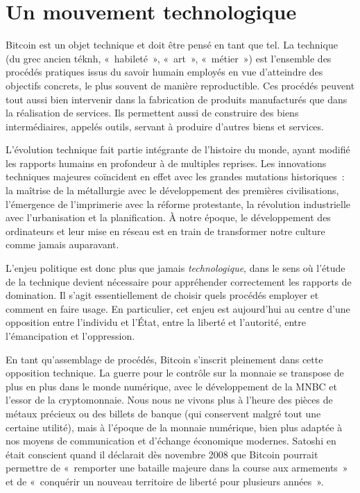 
\chapter{Un mouvement technologique}
\label{ch:cypherpunks}

Bitcoin est un objet technique et doit être pensé en tant que tel. La technique (du grec ancien \foreignlanguage{greek}{téknh}, «~habileté~», «~art~», «~métier~») est l'ensemble des procédés pratiques issus du savoir humain employés en vue d'atteindre des objectifs concrets, le plus souvent de manière reproductible. Ces procédés peuvent tout aussi bien intervenir dans la fabrication de produits manufacturés que dans la réalisation de services. Ils permettent aussi de construire des biens intermédiaires, appelés outils, servant à produire d'autres biens et services.

L'évolution technique fait partie intégrante de l'histoire du monde, ayant modifié les rapports humains en profondeur à de multiples reprises. Les innovations techniques majeures coïncident en effet avec les grandes mutations historiques~: la maîtrise de la métallurgie avec le développement des premières civilisations, l'émergence de l'imprimerie avec la réforme protestante, la révolution industrielle avec l'urbanisation et la planification. À notre époque, le développement des ordinateurs et leur mise en réseau est en train de transformer notre culture comme jamais auparavant.

L'enjeu politique est donc plus que jamais \emph{technologique}, dans le sens où l'étude de la technique devient nécessaire pour appréhender correctement les rapports de domination. Il s'agit essentiellement de choisir quels procédés employer et comment en faire usage.  En particulier, cet enjeu est aujourd'hui au centre d'une opposition entre l'individu et l'État, entre la liberté et l'autorité, entre l'émancipation et l'oppression.

En tant qu'assemblage de procédés, Bitcoin s'inscrit pleinement dans cette opposition technique. La guerre pour le contrôle sur la monnaie se transpose de plus en plus dans le monde numérique, avec le développement de la MNBC et l'essor de la cryptomonnaie. Nous nous ne vivons plus à l'heure des pièces de métaux précieux ou des billets de banque (qui conservent malgré tout une certaine utilité), mais à l'époque de la monnaie numérique, bien plus adaptée à nos moyens de communication et d'échange économique modernes. Satoshi en était conscient quand il déclarait dès novembre 2008 que Bitcoin pourrait permettre de «~remporter une bataille majeure dans la course aux armements~» et de «~conquérir un nouveau territoire de liberté pour plusieurs années~».

